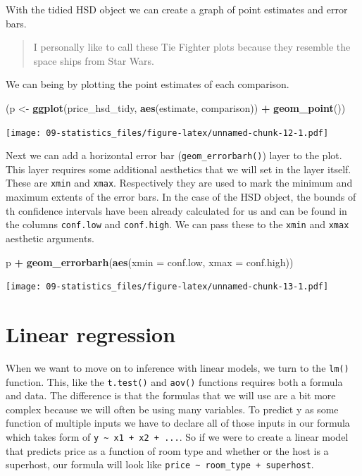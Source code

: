 \documentclass[
]{book}
\newenvironment{Shaded}{\begin{snugshade}}{\end{snugshade}}
\newcommand{\DataTypeTok}[1]{\textcolor[rgb]{0.13,0.29,0.53}{#1}}
\newcommand{\KeywordTok}[1]{\textcolor[rgb]{0.13,0.29,0.53}{\textbf{#1}}}
\newcommand{\NormalTok}[1]{#1}
\newcommand{\OperatorTok}[1]{\textcolor[rgb]{0.81,0.36,0.00}{\textbf{#1}}}
\newcommand{\StringTok}[1]{\textcolor[rgb]{0.31,0.60,0.02}{#1}}
\begin{document}
With the tidied HSD object we can create a graph of point estimates and error bars.

\begin{quote}
I personally like to call these Tie Fighter plots because they resemble the space ships from Star Wars.
\end{quote}

We can being by plotting the point estimates of each comparison.

\begin{Shaded}
\begin{Highlighting}[]
\NormalTok{(p \textless{}{-}}\StringTok{ }\KeywordTok{ggplot}\NormalTok{(price\_hsd\_tidy, }\KeywordTok{aes}\NormalTok{(estimate, comparison)) }\OperatorTok{+}
\StringTok{  }\KeywordTok{geom\_point}\NormalTok{())}
\end{Highlighting}
\end{Shaded}

\texttt{[image: 09-statistics\_files/figure-latex/unnamed-chunk-12-1.pdf]}

Next we can add a horizontal error bar (\texttt{geom\_errorbarh()}) layer to the plot. This layer requires some additional aesthetics that we will set in the layer itself. These are \texttt{xmin} and \texttt{xmax}. Respectively they are used to mark the minimum and maximum extents of the error bars. In the case of the HSD object, the bounds of th confidence intervals have been already calculated for us and can be found in the columns \texttt{conf.low} and \texttt{conf.high}. We can pass these to the \texttt{xmin} and \texttt{xmax} aesthetic arguments.

\begin{Shaded}
\begin{Highlighting}[]
\NormalTok{p }\OperatorTok{+}
\StringTok{  }\KeywordTok{geom\_errorbarh}\NormalTok{(}\KeywordTok{aes}\NormalTok{(}\DataTypeTok{xmin =}\NormalTok{ conf.low, }\DataTypeTok{xmax =}\NormalTok{ conf.high))}
\end{Highlighting}
\end{Shaded}

\texttt{[image: 09-statistics\_files/figure-latex/unnamed-chunk-13-1.pdf]}

\hypertarget{linear-regression}{%
\section{Linear regression}\label{linear-regression}}

When we want to move on to inference with linear models, we turn to the \texttt{lm()} function. This, like the \texttt{t.test()} and \texttt{aov()} functions requires both a formula and data. The difference is that the formulas that we will use are a bit more complex because we will often be using many variables. To predict y as some function of multiple inputs we have to declare all of those inputs in our formula which takes form of \texttt{y\ \textasciitilde{}\ x1\ +\ x2\ +\ ...}. So if we were to create a linear model that predicts price as a function of room type and whether or the host is a superhost, our formula will look like \texttt{price\ \textasciitilde{}\ room\_type\ +\ superhost}.
\end{document}
